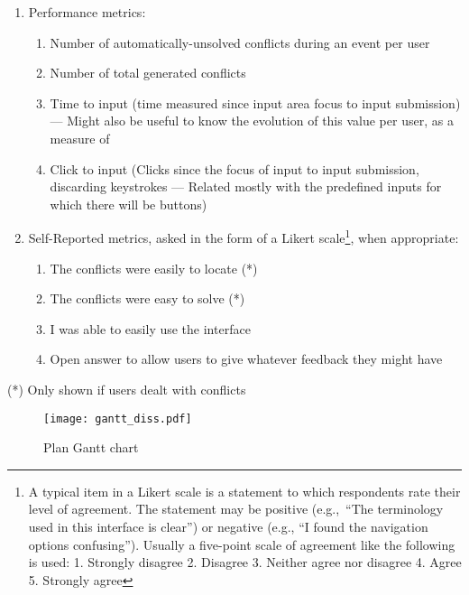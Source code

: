 \begin{enumerate}
    \item Performance metrics:
    \begin{enumerate}
        \item Number of automatically-unsolved conflicts during an event per user
        \item Number of total generated conflicts
        \item Time to input (time measured since input area focus to input submission) --- Might also be useful to know the evolution of this value per user, as a measure of 
        \item Click to input (Clicks since the focus of input to input submission, discarding keystrokes --- Related mostly with the predefined inputs for which there will be buttons)
    \end{enumerate}
    \item Self-Reported metrics, asked in the form of a Likert scale\footnote{A typical item in a Likert scale is a statement to which respondents rate
    their level of agreement. The statement may be positive (e.g.,\ “The terminology used in this interface is clear”) or negative (e.g., “I found the navigation options confusing”). Usually a five-point scale of agreement like the following is used: 1. Strongly disagree 2. Disagree 3. Neither agree nor disagree 4. Agree 5. Strongly agree}, when appropriate:
    \begin{enumerate}
        \item The conflicts were easily to locate (*)
        \item The conflicts were easy to solve (*)
        \item I was able to easily use the interface \\
        \item Open answer to allow users to give whatever feedback they might have
    \end{enumerate}
\end{enumerate}

(*) Only shown if users dealt with conflicts


\begin{landscape}
\begin{figure}
   \centering
    \texttt{[image: gantt\_diss.pdf]}
    \caption{Plan Gantt chart}
    \label{fig:gantt-plan}
\end{figure}
\end{landscape}
